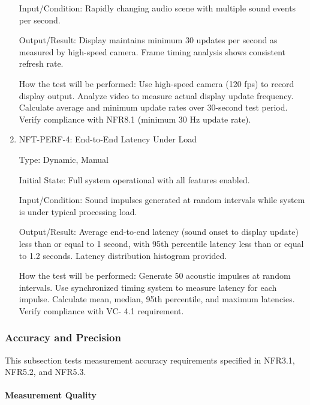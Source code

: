 \documentclass[12pt, titlepage]{article}
\begin{document}
\begin{enumerate}
Input/Condition: Rapidly changing audio scene with multiple sound events per
second.

Output/Result: Display maintains minimum 30 updates per second as measured by
high-speed camera. Frame timing analysis shows consistent refresh rate.

How the test will be performed: Use high-speed camera (120 fps) to record display
output. Analyze video to measure actual display update frequency. Calculate
average and minimum update rates over 30-second test period. Verify compliance
with NFR8.1 (minimum 30 Hz update rate).

\item{NFT-PERF-4: End-to-End Latency Under Load\\}

Type: Dynamic, Manual

Initial State: Full system operational with all features enabled.

Input/Condition: Sound impulses generated at random intervals while system is
under typical processing load.

Output/Result: Average end-to-end latency (sound onset to display update) less 
than or equal to 1 second, with 95th percentile latency less than or equal 
to 1.2 seconds. Latency distribution histogram provided.

How the test will be performed: Generate 50 acoustic impulses at random intervals.
Use synchronized timing system to measure latency for each impulse. Calculate
mean, median, 95th percentile, and maximum latencies. Verify compliance with VC-
4.1 requirement.

\end{enumerate}

\subsubsection{Accuracy and Precision}

This subsection tests measurement accuracy requirements specified in NFR3.1,
NFR5.2, and NFR5.3.

\paragraph{Measurement Quality}
\end{document}
